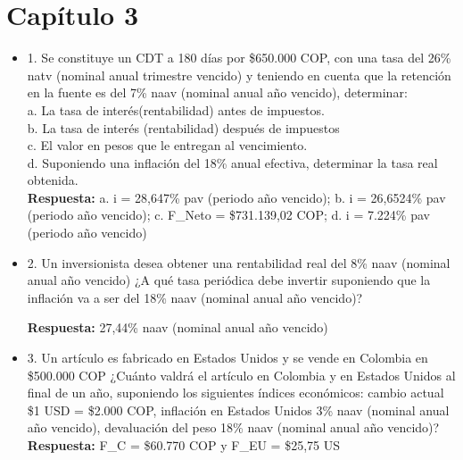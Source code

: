 \chapter*{Capítulo 3}


\begin{itemize}

 \item 1. Se  constituye  un  CDT  a  180  días  por \$650.000 COP,  con  una  tasa  del  26\% natv (nominal anual trimestre vencido) y teniendo  en  cuenta  que  la retención en la fuente es del 7\% naav (nominal anual año vencido), determinar:\\

       a. La tasa de interés(rentabilidad) antes de impuestos.\\
       b. La tasa de interés (rentabilidad) después de impuestos\\
       c. El valor en pesos que le entregan al vencimiento.\\
       d. Suponiendo una inflación del 18\% anual efectiva, determinar la tasa real obtenida.\\
       \textbf{Respuesta:} a. i = 28,647\% pav (periodo año vencido); b. i = 26,6524\% pav (periodo año vencido); c. F_{Neto} = \$731.139,02 COP; d. i = 7.224\% pav (periodo año vencido)\\
       \medskip

 \item 2. Un inversionista desea  obtener  una  rentabilidad  real  del  8\%  naav (nominal anual año vencido) ¿A qué tasa periódica debe invertir suponiendo que la inflación va a ser del 18\% naav (nominal anual año vencido)?

       \textbf{Respuesta:} 27,44\% naav (nominal anual año vencido)\\
       \medskip

 \item 3. Un  artículo  es  fabricado  en  Estados  Unidos  y  se  vende  en  Colombia  en \$500.000 COP ¿Cuánto  valdrá  el  artículo  en  Colombia  y  en  Estados  Unidos  al final  de  un  año,  suponiendo  los  siguientes  índices  económicos: cambio actual \$1 USD =  \$2.000 COP, inflación en Estados Unidos 3\% naav (nominal anual año vencido), devaluación del peso 18\% naav (nominal anual año vencido)?\\
       \textbf{Respuesta:} F_{C} = \$60.770 COP y F_{EU} = \$25,75 US\\
       \medskip


\end{itemize}
